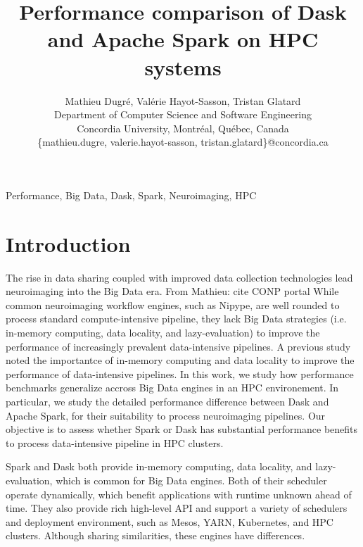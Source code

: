 \documentclass[conference]{IEEEtran}
\newcommand{\MD}[1]{\color{magenta}From Mathieu: #1 \color{black}}
\begin{document}
\title{Performance comparison of Dask and Apache Spark on HPC systems}

\author{Mathieu Dugr\'e, Val\'erie Hayot-Sasson, Tristan Glatard\\
	Department of Computer Science and Software Engineering\\
	Concordia University, Montr\'eal, Qu\'ebec, Canada\\
	\{mathieu.dugre, valerie.hayot-sasson, tristan.glatard\}@concordia.ca
	\vspace*{0.8cm} %
}

\maketitle

\begin{abstract}
\end{abstract}

\begin{IEEEkeywords}
	Performance, Big Data, Dask, Spark, Neuroimaging, HPC
\end{IEEEkeywords}

\section{Introduction}
The rise in data sharing coupled with improved data collection technologies lead neuroimaging into the Big Data era\cite{ALFAROALMAGRO:18, van2014human}. \MD{cite CONP portal}
While common neuroimaging workflow engines, such as Nipype\cite{Nipype:11}, are well rounded to process standard compute-intensive pipeline,
they lack Big Data strategies (i.e. in-memory computing, data locality, and lazy-evaluation) to improve the performance of increasingly prevalent data-intensive pipelines.
A previous study\cite{hayot2019performance} noted the importantce of in-memory computing and data locality to improve the performance of data-intensive pipelines.
In this work, we study how performance benchmarks generalize accross Big Data engines in an HPC environement.
In particular, we study the detailed performance difference between Dask\cite{Dask:15} and Apache Spark\cite{Spark:16}, for their suitability to process neuroimaging pipelines.
Our objective is to assess whether Spark or Dask has substantial performance benefits to process data-intensive pipeline in HPC clusters.

Spark and Dask both provide in-memory computing, data locality, and lazy-evaluation, which is common for Big Data engines.
Both of their scheduler operate dynamically, which benefit applications with runtime unknown ahead of time\cite{Dask:15}.
They also provide rich high-level API and support a variety of schedulers and deployment environment, such as Mesos\cite{hindman2011mesos}, YARN\cite{vavilapalli2013apache}, Kubernetes, and HPC clusters.
Although sharing similarities, these engines have differences.
\end{document}
